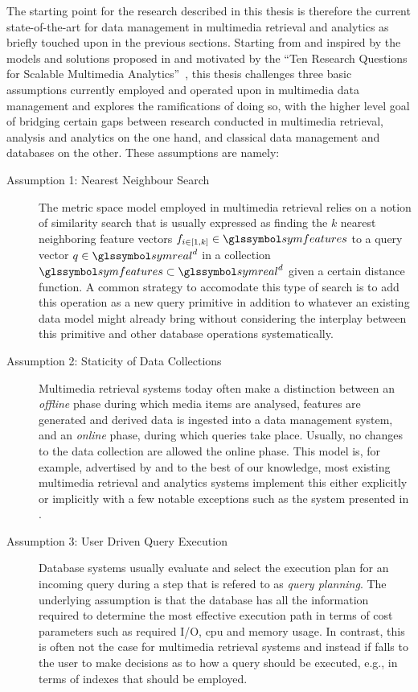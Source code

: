 The starting point for the research described in this thesis is therefore the current state-of-the-art for data management in multimedia retrieval and analytics as briefly touched upon in the previous sections. Starting from and inspired by the models and solutions proposed in \cite{Giangreco:2016Adam,Giangreco:2018Database} and motivated by the ``Ten Research Questions for Scalable Multimedia Analytics''~\cite{Jonson:2016Ten}, this thesis challenges three basic assumptions currently employed and operated upon in multimedia data management and explores the ramifications of doing so, with the higher level goal of bridging certain gaps between research conducted in multimedia retrieval, analysis and analytics on the one hand, and classical data management and databases on the other. These assumptions are namely:

\begin{description}
    \item[Assumption 1: Nearest Neighbour Search] The metric space model employed in multimedia retrieval \cite{Zezula:2006Similarity} relies on a notion of similarity search that is usually expressed as finding the $k$ nearest neighboring feature vectors $f_{i \in \left[1,k\right]} \in \symfeatures$ to a query vector $q \in \symreal^d$ in a collection $\symfeatures \subset \symreal^d$ given a certain distance function. A common strategy to accomodate this type of search is to add this operation as a new query primitive in addition to whatever an existing data model might already bring \cite{Guliato:2009PostgreSQL,Giangreco:2016Adam,Yang:2020Pase} without considering the interplay between this primitive and other database operations systematically.

    \item[Assumption 2: Staticity of Data Collections] Multimedia retrieval systems today often make a distinction between an \emph{offline} phase during which media items are analysed, features are generated and derived data is ingested into a data management system, and an \emph{online} phase, during which queries take place. Usually, no changes to the data collection are allowed the online phase. This model is, for example, advertised by \cite{Flickner:1995Query,Kiranyaz:2003Muvis,Giangreco:2018Database,Rossetto:2018Multi} and to the best of our knowledge, most existing multimedia retrieval and analytics systems implement this either explicitly or implicitly with a few notable exceptions such as the system presented in \cite{Wang:2021Milvus}.

    \item[Assumption 3: User Driven Query Execution] Database systems usually evaluate and select the execution plan for an incoming query during a step that is refered to as \emph{query planning}. The underlying assumption is that the database has all the information required to determine the most effective execution path in terms of cost parameters such as required I/O, \acrshort{cpu} and memory usage. In contrast, this is often not the case for multimedia retrieval systems and instead if falls to the user to make decisions as to how a query should be executed, e.g., in terms of indexes that should be employed.
\end{description}

